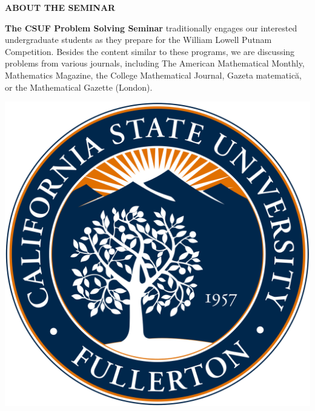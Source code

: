 \documentclass[a4paper]{article}
\begin{document}
\begin{minipage}{0.95\textwidth}
\begin{minipage}[b]{0.47\textwidth}
{\large\raggedright
{\textbf{\color{csecondary}ABOUT THE SEMINAR}}\par
}
\normalsize
\smallskip

\textbf{\color{cprimary}The CSUF Problem Solving Seminar} traditionally engages our interested undergraduate students as they prepare for
the William Lowell Putnam Competition. Besides the content similar to these programs, we are discussing problems
from various journals, including The American Mathematical Monthly, Mathematics Magazine, the College
Mathematical Journal, Gazeta matematică, or the Mathematical Gazette (London).


\medskip
\begin{center}
\includegraphics[width=0.7\linewidth]{csuf_seal.png}
\end{center}
\smallskip

\bigskip
\bigskip
\bigskip
\medskip

\rule{0pt}{32pt}
\end{minipage}\hspace{5pt}
\begin{minipage}[b]{0.47\textwidth}
\medskip
\medskip



\end{minipage}
\end{minipage}
\end{document}
